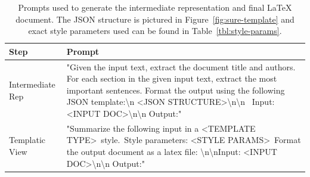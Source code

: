 \begin{table}
\small
\centering
\begin{tabular}{lp{}}
Step & Prompt \\ \hline
Intermediate Rep & "Given the input text, extract the document title and authors. For each section in the given input text, extract the most important sentences. Format the output using the following JSON template:\textbackslash{}n \textless{}JSON STRUCTURE\textgreater \textbackslash{}n\textbackslash{}n ~Input: \textless{}INPUT DOC\textgreater\textbackslash{}n\textbackslash{}n Output:" \\
\hdashline[0.5pt/3pt] 
Templatic View & "Summarize the following input in a \textless{}TEMPLATE TYPE\textgreater ~style.~Style parameters: \textless{}STYLE PARAMS\textgreater~Format the output document as a latex file: \textbackslash{}n\textbackslash{}nInput: \textless{}INPUT DOC\textgreater \textbackslash{}n\textbackslash{}n Output:"
\end{tabular}
    \caption{Prompts used to generate the intermediate representation and final LaTeX document. The JSON structure is pictured in Figure~\ref{fig:sure-template} and exact style parameters used can be found in Table~\ref{tbl:style-params}.} %
    \label{tbl:prompts}
\end{table}